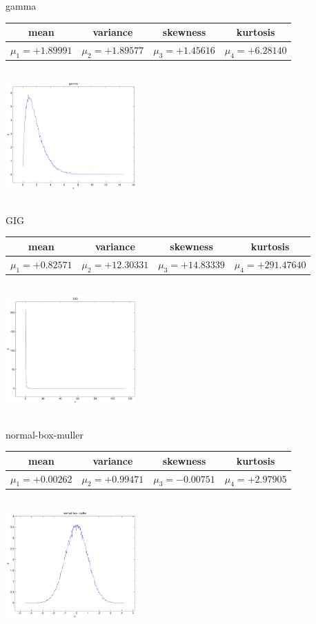 \documentclass[9pt]{article}
\theoremstyle{plain}
\theoremstyle{definition}
\theoremstyle{remark}
\numberwithin{equation}{section}
\begin{document}
\newpage
gamma \begin{tabular}{|c|c|c|c|}  mean & variance & skewness & kurtosis \\  \hline
$\mu_1 = +1.89991$ & $\mu_2 = +1.89577$ & $\mu_3 = +1.45616$ & $\mu_4 =+6.28140$ \\
\end{tabular}

\includegraphics[width=5cm,height=5cm]{gamma.pdf}

GIG \begin{tabular}{|c|c|c|c|}  mean & variance & skewness & kurtosis \\  \hline
$\mu_1 = +0.82571$ & $\mu_2 = +12.30331$ & $\mu_3 = +14.83339$ & $\mu_4 =+291.47640$ \\
\end{tabular}

\includegraphics[width=5cm,height=5cm]{GIG.pdf}

normal-box-muller \begin{tabular}{|c|c|c|c|}  mean & variance & skewness & kurtosis \\  \hline
$\mu_1 = +0.00262$ & $\mu_2 = +0.99471$ & $\mu_3 = -0.00751$ & $\mu_4 =+2.97905$ \\
\end{tabular}

\includegraphics[width=5cm,height=5cm]{normal-box-muller.pdf}
\end{document}
